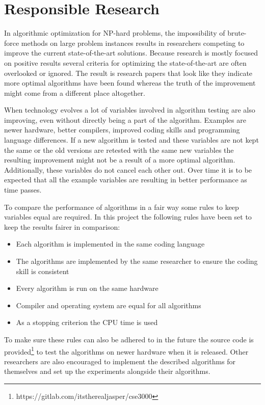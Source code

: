 \section{Responsible Research} \label{section:responsible_research}
In algorithmic optimization for NP-hard problems, the impossibility of brute-force methods on large problem instances results in researchers competing to improve the current state-of-the-art solutions. Because research is mostly focused on positive results several criteria for optimizing the state-of-the-art are often overlooked or ignored. The result is research papers that look like they indicate more optimal algorithms have been found whereas the truth of the improvement might come from a different place altogether.

When technology evolves a lot of variables involved in algorithm testing are also improving, even without directly being a part of the algorithm. Examples are newer hardware, better compilers, improved coding skills and programming language differences. If a new algorithm is tested and these variables are not kept the same or the old versions are retested with the same new variables the resulting improvement might not be a result of a more optimal algorithm. Additionally, these variables do not cancel each other out. Over time it is to be expected that all the example variables are resulting in better performance as time passes.

To compare the performance of algorithms in a fair way some rules to keep variables equal are required. In this project the following rules have been set to keep the results fairer in comparison: 
\begin{itemize}
\item Each algorithm is implemented in the same coding language
\item The algorithms are implemented by the same researcher to ensure the coding skill is consistent
\item Every algorithm is run on the same hardware
\item Compiler and operating system are equal for all algorithms
\item As a stopping criterion the CPU time is used
\end{itemize}
To make sure these rules can also be adhered to in the future the source code is provided\footnote{https://gitlab.com/itstherealjasper/cse3000} to test the algorithms on newer hardware when it is released. Other researchers are also encouraged to implement the described algorithms for themselves and set up the experiments alongside their algorithms.


